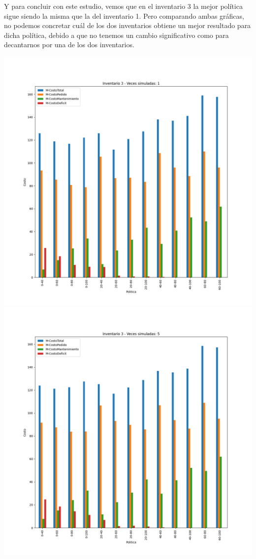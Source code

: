 \documentclass[11pt,a4paper]{report}
\begin{document}
Y para concluir con este estudio, vemos que en el inventario 3 la mejor política sigue siendo la misma que la del inventario 1. Pero comparando ambas gráficas, no podemos concretar cuál de los dos inventarios obtiene un mejor resultado para dicha política, debido a que no tenemos un cambio significativo como para decantarnos por una de los dos inventarios. 

\begin{center}
	\includegraphics[width=0.4\textheight]{img/Cap-2/inventario-3/inventario3-1veces.png}
	\includegraphics[width=0.4\textheight]{img/Cap-2/inventario-3/inventario3-5veces.png}

\end{center}
\end{document}
